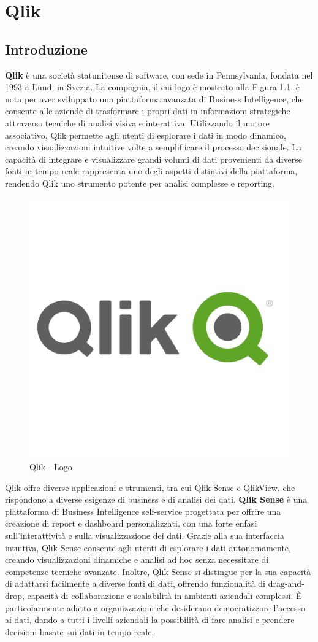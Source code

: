 
\chapter{Qlik}
\section{Introduzione}
\textbf{Qlik} è una società statunitense di software, con sede in Pennsylvania, fondata nel 1993 a Lund, in Svezia. La compagnia, il cui logo è mostrato alla Figura \ref{fig:QlikLogo}, è nota per aver sviluppato una piattaforma avanzata di Business Intelligence, che consente alle aziende di trasformare i propri dati in informazioni strategiche attraverso tecniche di analisi visiva e interattiva. Utilizzando il motore associativo, Qlik permette agli utenti di esplorare i dati in modo dinamico, creando visualizzazioni intuitive volte a semplifiicare il processo decisionale. La capacità di integrare e visualizzare grandi volumi di dati provenienti da diverse fonti in tempo reale rappresenta uno degli aspetti distintivi della piattaforma, rendendo Qlik uno strumento potente per analisi complesse e reporting.

\begin{figure}[h!]
    \centering
    \includegraphics[width=0.35\linewidth]{capitolo_1/img1/QlikLogo.pdf}
    \caption{Qlik - Logo}
    \label{fig:QlikLogo}
\end{figure}

Qlik offre diverse applicazioni e strumenti, tra cui Qlik Sense e QlikView, che rispondono a diverse esigenze di business e di analisi dei dati. \textbf{Qlik Sense} è una piattaforma di Business Intelligence self-service progettata per offrire una creazione di report e dashboard personalizzati, con una forte enfasi sull'interattività e sulla visualizzazione dei dati. Grazie alla sua interfaccia intuitiva, Qlik Sense consente agli utenti di esplorare i dati autonomamente, creando visualizzazioni dinamiche e analisi ad hoc senza necessitare di competenze tecniche avanzate. Inoltre, Qlik Sense si distingue per la sua capacità di adattarsi facilmente a diverse fonti di dati, offrendo funzionalità di drag-and-drop, capacità di collaborazione e scalabilità in ambienti aziendali complessi. È particolarmente adatto a organizzazioni che desiderano democratizzare l'accesso ai dati, dando a tutti i livelli aziendali la possibilità di fare analisi e prendere decisioni basate sui dati in tempo reale.

